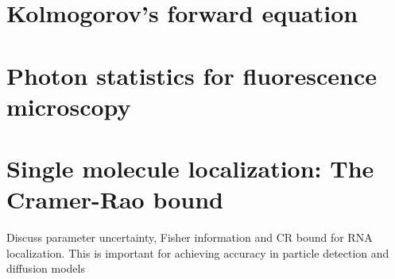 \documentclass{article}
\begin{document}


\appendix

\section{Kolmogorov's forward equation}

\section{Photon statistics for fluorescence microscopy}


\section{Single molecule localization: The Cramer-Rao bound}

Discuss parameter uncertainty, Fisher information and CR bound for RNA localization. This is important for achieving accuracy in particle detection and diffusion models
\end{document}
